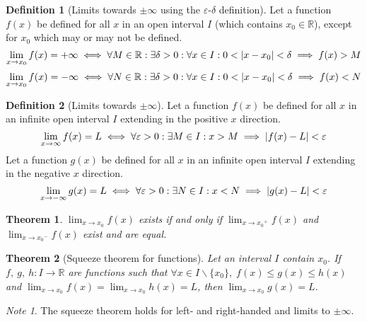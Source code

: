 \documentclass{article}
\newcommand*{\R}{\mathbb{R}}
\theoremstyle{plain}
\newtheorem{theorem}{Theorem}[section]
\numberwithin{theorem}{subsection}
\theoremstyle{definition}
\newtheorem{definition}{Definition}[section]
\numberwithin{definition}{subsection}
\theoremstyle{remark}
\newtheorem{note}{Note}[section]
\numberwithin{note}{subsection}
\begin{document}
%
\begin{definition}[Limits towards $\pm\infty$ using the $\varepsilon$-$\delta$ definition]
    Let a function $f(x)$ be defined for all $x$ in an open interval $I$
    (which contains $x_0 \in \R$), except for $x_0$ which may or may not be defined.
    \begin{equation*}
        \lim_{x\to x_0} f(x) = +\infty \iff \forall M \in \R: \exists\delta>0: \forall x \in I: 0<\abs{x-x_0}<\delta \implies f(x) > M
    \end{equation*}
    \begin{equation*}
        \lim_{x\to x_0} f(x) = -\infty \iff \forall N \in \R: \exists\delta>0: \forall x \in I: 0<\abs{x-x_0}<\delta \implies f(x) < N
    \end{equation*}
\end{definition}
%
\begin{definition}[Limits towards $\pm\infty$]
    Let a function $f(x)$ be defined for all $x$ in an infinite open interval $I$
    extending in the positive $x$ direction.
    \begin{equation*}
        \lim_{x\to\infty} f(x) = L \iff \forall \varepsilon>0: \exists M \in I: x>M \implies \abs{f(x)-L}<\varepsilon
    \end{equation*}
    Let a function $g(x)$ be defined for all $x$ in an infinite open interval $I$
    extending in the negative $x$ direction.
    \begin{equation*}
        \lim_{x\to-\infty} g(x) = L \iff \forall \varepsilon>0: \exists N \in I: x<N \implies \abs{g(x)-L}<\varepsilon
    \end{equation*}
\end{definition}
%
\begin{theorem}
    $\displaystyle\lim_{x\to x_0} f(x)$ exists if and only if
    $\displaystyle\lim_{x\to {x_0}^+} f(x)$ and $\displaystyle\lim_{x\to {x_0}^-} f(x)$
    exist and are equal.
\end{theorem}
%
\begin{theorem}[Squeeze theorem for functions]
    Let an interval $I$ contain $x_0$.
    If $f,\:g,\:h : I \to \R$ are functions such that
    $\forall x \in I\backslash\{x_0\},\; f(x)\leqslant g(x)\leqslant h(x)$
    and
    $\displaystyle\lim_{x\to x_0} f(x) = \lim_{x\to x_0} h(x) = L$,
    then
    $\displaystyle\lim_{x\to x_0} g(x) = L$.
\end{theorem}
%
\begin{note}
    The squeeze theorem holds for left- and right-handed and limits to $\pm\infty$.
\end{note}
\end{document}
